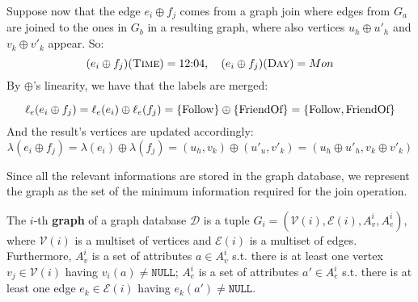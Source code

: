 



\begin{example}[continues=ex:onJoinDataModel]
Suppose now that the edge $e_i\oplus f_j$ comes from
	a graph join where edges from $G_a$ are joined to the ones in $G_b$ in a resulting graph,
	where also vertices $u_h\oplus u'_h$
	and $v_k\oplus v'_k$ appear. So:
	\[(e_i\oplus f_j)(\textsc{Time})=12\textup{:}04,\quad (e_i\oplus f_j)(\textsc{Day})=Mon\]
	By $\oplus$'s linearity, we have that the labels are merged:

	\[\ell_e(e_i\oplus f_j)=\ell_e(e_i)\oplus\ell_e(f_j)=\{\textup{Follow}\}\oplus\{\textup{FriendOf}\}=\{\textup{Follow},\textup{FriendOf}\}\]
	And the result's vertices are updated accordingly:
	\[\lambda(e_i\oplus f_j) = \lambda(e_i)\oplus\lambda(f_j)=(u_h,v_k)\oplus(u'_u,v'_k)=(u_h\oplus u'_h,v_k\oplus v'_k)\]
\end{example}

Since all the relevant informations are stored in the graph database, we represent 
the graph as the set of the minimum information required for the join operation.

\begin{definition}[Graph]
	The $i$-th \textbf{graph} of a graph da\-tabase $\mathcal{D}$ 
	is a tuple
	$G_i=(\mathcal{V}(i),\mathcal{E}(i),A_v^i,A_e^i)$, where $\mathcal{V}(i)$ is a multiset of vertices and 
	$\mathcal{E}(i)$ is a multiset of edges. Furthermore, $A_v^i$ is a set of attributes 
	$a\in A_v^i$ s.t. there is at least one vertex $v_j\in \mathcal{V}(i)$ having $v_i(a)\neq\texttt{NULL}$; $A_e^i$ is a set of attributes $a'\in A_e^i$ s.t. there
	is at least one edge $e_k\in \mathcal{E}(i)$ having $e_k(a')\neq\texttt{NULL}$.
\end{definition}
